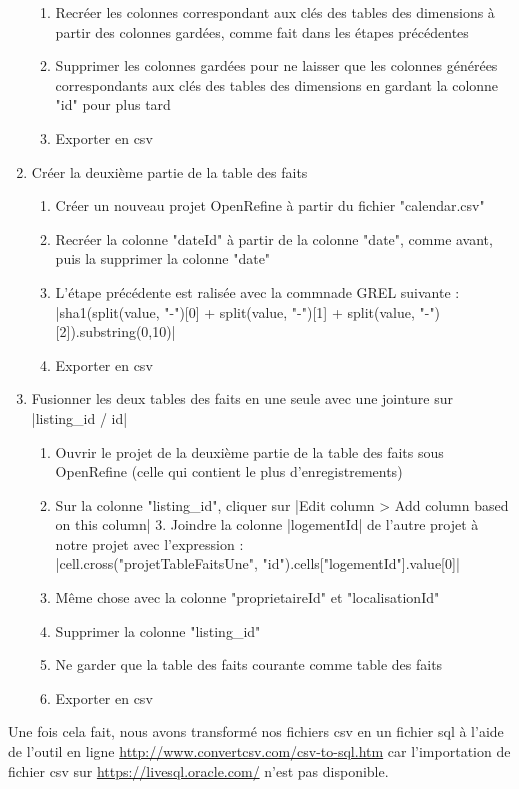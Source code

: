 \documentclass[11pt, a4paper]{article}
\begin{document}
\begin{enumerate}
\begin{enumerate}[label=\roman*.]
      \item Recréer les colonnes correspondant aux clés des tables des dimensions à partir des colonnes gardées, comme fait dans les étapes précédentes
      \item Supprimer les colonnes gardées pour ne laisser que les colonnes générées correspondants aux clés des tables des dimensions en gardant la colonne \spverb"id" pour plus tard
      \item Exporter en csv
   \end{enumerate}
   \item Créer la deuxième partie de la table des faits
   \begin{enumerate}[label=\roman*.]
      \item Créer un nouveau projet OpenRefine à partir du fichier \spverb"calendar.csv"
      \item Recréer la colonne \spverb"dateId" à partir de la colonne \spverb"date", comme avant, puis la supprimer la colonne \spverb"date"
      \item L'étape précédente est ralisée avec la commnade GREL suivante : \spverb|sha1(split(value, "-")[0] + split(value, "-")[1] + split(value, "-")[2]).substring(0,10)|
      \item Exporter en csv
   \end{enumerate}
   \item Fusionner les deux tables des faits en une seule avec une jointure sur \spverb|listing_id / id|
   \begin{enumerate}[label=\roman*.]
      \item Ouvrir le projet de la deuxième partie de la table des faits sous OpenRefine (celle qui contient le plus d'enregistrements)
      \item Sur la colonne \spverb"listing_id", cliquer sur \spverb|Edit column > Add column based on this column| 3. Joindre la colonne \spverb|logementId| de l'autre projet à notre projet avec l'expression : \\ \spverb|cell.cross("projetTableFaitsUne", "id").cells["logementId"].value[0]|
      \item Même chose avec la colonne \spverb"proprietaireId" et \spverb"localisationId"
      \item Supprimer la colonne \spverb"listing_id"
      \item Ne garder que la table des faits courante comme table des faits
      \item Exporter en csv
   \end{enumerate}
\end{enumerate}
Une fois cela fait, nous avons transformé nos fichiers csv en un fichier sql à l'aide de l'outil en ligne \url{http://www.convertcsv.com/csv-to-sql.htm} car l'importation de fichier csv sur \url{https://livesql.oracle.com/} n'est pas disponible.
\end{document}
